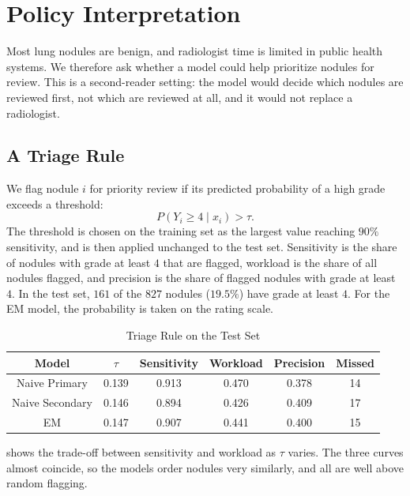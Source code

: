 \documentclass[12pt]{article}
\begin{document}
\section{Policy Interpretation}

Most lung nodules are benign, and radiologist time is limited in public health
systems. We therefore ask whether a model could help prioritize nodules for
review. This is a second-reader setting: the model would decide which nodules
are reviewed first, not which are reviewed at all, and it would not replace a
radiologist.

\subsection{A Triage Rule}

We flag nodule $i$ for priority review if its predicted probability of a
high grade exceeds a threshold:
\[
  P(Y_i \ge 4 \mid x_i) > \tau.
\]
The threshold is chosen on the training set as the largest value reaching
$90\%$ sensitivity, and is then applied unchanged to the test set. Sensitivity
is the share of nodules with grade at least $4$ that are flagged, workload is
the share of all nodules flagged, and precision is the share of flagged
nodules with grade at least $4$. In the test set, $161$ of the $827$ nodules
($19.5\%$) have grade at least $4$. For the EM model, the probability is taken
on the rating scale.

\begin{table}[H]
  \centering
  \begin{tabular}{|| c | c | c | c | c | c ||}
    \hline
    \textbf{Model} & $\tau$ & \textbf{Sensitivity} & \textbf{Workload}
    & \textbf{Precision} & \textbf{Missed} \\[0.5ex]
    \hline\hline
    Naive Primary & 0.139 & 0.913 & 0.470 & 0.378 & 14 \\
    Naive Secondary & 0.146 & 0.894 & 0.426 & 0.409 & 17 \\
    EM & 0.147 & 0.907 & 0.441 & 0.400 & 15 \\
    \hline
  \end{tabular}
  \caption{Triage Rule on the Test Set}
  \label{table:triage}
\end{table}

 shows the trade-off between sensitivity and workload
as $\tau$ varies. The three curves almost coincide, so the models order
nodules very similarly, and all are well above random flagging.
\end{document}
